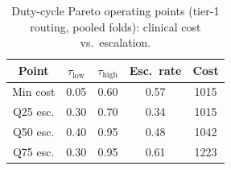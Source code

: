 \begin{table}[!t]
\centering
\caption{Duty-cycle Pareto operating points (tier-1 routing, pooled folds): clinical cost vs.\ escalation.}
\label{tab:pareto}
\begin{tabular}{ccccc}
\toprule
Point & $\tau_{\mathrm{low}}$ & $\tau_{\mathrm{high}}$ & Esc.\ rate & Cost \\
\midrule
Min cost & 0.05 & 0.60 & 0.57 & 1015 \\
Q25 esc. & 0.30 & 0.70 & 0.34 & 1015 \\
Q50 esc. & 0.40 & 0.95 & 0.48 & 1042 \\
Q75 esc. & 0.30 & 0.95 & 0.61 & 1223 \\
\bottomrule
\end{tabular}
\end{table}
